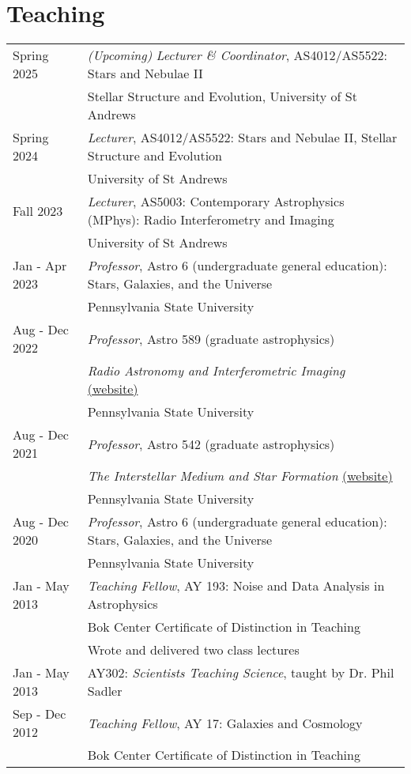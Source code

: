 \section*{Teaching}
\begin{tabular*}{\textwidth}{@{\hspace{10pt}}p{1.4in}l}
Spring 2025 & \emph{(Upcoming)} \emph{Lecturer \& Coordinator}, AS4012/AS5522: Stars and Nebulae II\\
& Stellar Structure and Evolution, University of St Andrews \\
Spring 2024 & \emph{Lecturer}, AS4012/AS5522: Stars and Nebulae II, Stellar Structure and Evolution \\
& University of St Andrews \\
Fall 2023 & \emph{Lecturer}, AS5003: Contemporary Astrophysics (MPhys): Radio Interferometry and Imaging \\
& University of St Andrews \\
Jan - Apr 2023 & \emph{Professor}, Astro 6 (undergraduate general education): Stars, Galaxies, and the Universe\\
& Pennsylvania State University \\    
Aug - Dec 2022 & \emph{Professor}, Astro 589 (graduate astrophysics)\\
& \emph{Radio Astronomy and Interferometric Imaging} \href{https://iancze.github.io/courses/astro589/}{(website)}\\    
& Pennsylvania State University \\ 
Aug - Dec 2021 & \emph{Professor}, Astro 542 (graduate astrophysics)\\
& \emph{The Interstellar Medium and Star Formation} \href{https://iancze.github.io/courses/astro542/}{(website)}\\    
& Pennsylvania State University \\ 
Aug - Dec 2020 & \emph{Professor}, Astro 6 (undergraduate general education): Stars, Galaxies, and the Universe\\
& Pennsylvania State University \\ 
Jan - May 2013 & \emph{Teaching Fellow}, AY 193: Noise and Data Analysis in Astrophysics\\
& Bok Center Certificate of Distinction in Teaching\\
& Wrote and delivered two class lectures\\
Jan - May 2013 & AY302: \emph{Scientists Teaching Science}, taught by Dr. Phil Sadler\\
Sep - Dec 2012 & \emph{Teaching Fellow}, AY 17: Galaxies and Cosmology\\
& Bok Center Certificate of Distinction in Teaching\\
\end{tabular*}
